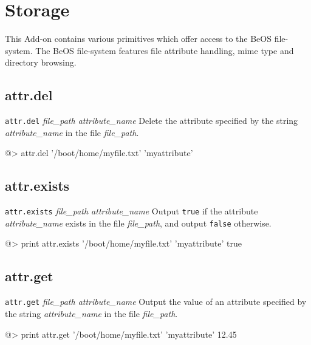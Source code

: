 \section{Storage}

This Add-on contains various primitives which offer access to the BeOS file-system.  The BeOS file-system features file attribute handling, mime type and directory browsing.

\subsection*{attr.del} 

{\tt attr.del} {\it file\_path attribute\_name}
\newline\newline
Delete the attribute specified by the string {\it attribute\_name} in the file {\it file\_path}.
\begin{verbatimtab}
@> attr.del '/boot/home/myfile.txt' 'myattribute'
\end{verbatimtab}

\subsection*{attr.exists} 

{\tt attr.exists} {\it file\_path attribute\_name}
\newline\newline
Output {\tt true} if the attribute {\it attribute\_name} exists in the file {\it file\_path}, and output {\tt false} otherwise.
\begin{verbatimtab}
@> print attr.exists '/boot/home/myfile.txt' 'myattribute'
true
\end{verbatimtab}

\subsection*{attr.get} 

{\tt attr.get} {\it file\_path attribute\_name}
\newline\newline
Output the value of an attribute specified by the string {\it attribute\_name} in the file {\it file\_path}.
\begin{verbatimtab}
@> print attr.get '/boot/home/myfile.txt' 'myattribute'
12.45
\end{verbatimtab}

